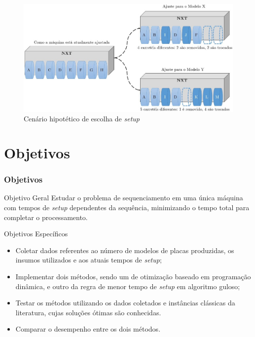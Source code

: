 \documentclass{beamer}
\begin{document}
\begin{frame}
\begin{figure}[h]
\centering
\includegraphics[scale=0.7]{Imagem3}
\caption{Cenário hipotético de escolha de \textit{setup}}
\label{fig:funcionamentoNxt}
\end{figure}
\end{frame}
\section{Objetivos}
\begin{frame}
\tableofcontents[ 
    currentsubsection, 
    hideothersubsections, 
    sectionstyle=show/shaded
    ] 
\end{frame}
\begin{frame}
\frametitle{Objetivos}
\large
\begin{block}{Objetivo Geral}
Estudar o problema de sequenciamento em uma única máquina com tempos de \textit{setup} dependentes da sequência, minimizando o tempo total para completar o processamento.
\end{block}
\pause
\begin{block}{Objetivos Específicos}
\begin{itemize}
\item Coletar dados referentes ao número de modelos de placas produzidas, os insumos utilizados e aos atuais tempos de \textit{setup};
\item Implementar dois métodos, sendo um de otimização baseado em programação dinâmica, e outro da regra de menor tempo de \textit{setup} em algoritmo guloso;
\item Testar os métodos utilizando os dados coletados e instâncias clássicas da literatura, cujas soluções ótimas são conhecidas.
\item Comparar o desempenho entre os dois métodos.
\end{itemize}

\end{block}

\end{frame}
\end{document}
